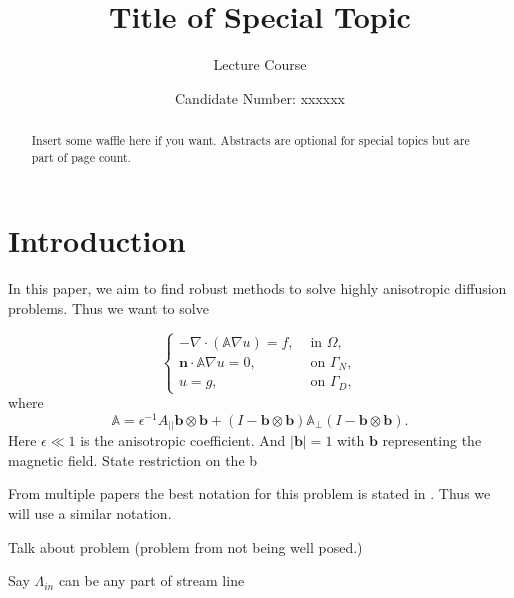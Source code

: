 \documentclass[12pt,a4paper]{article}
\title{Title of Special Topic}
\author{Lecture Course}
\date{Candidate Number: xxxxxx}
\begin{document}
\maketitle

\thispagestyle{empty}

\newpage
\setcounter{page}{1}



\begin{abstract}
  Insert some waffle here if you want. Abstracts are optional for
  special topics but are part of page count.
\end{abstract}

\section{Introduction}
In this paper, we aim to find robust methods to solve highly anisotropic diffusion problems. Thus we want to solve

\begin{equation}
\begin{cases}
-\nabla \cdot (\mathbb{A}\nabla u) = f, & \text{ in }\Omega,\\
\mathbf{n}\cdot \mathbb{A}\nabla u = 0, & \text{ on }\Gamma_N, \\
u = g, & \text{  on }\Gamma_D,
\end{cases}
\end{equation}
where
\begin{equation}
\mathbb{A} = \epsilon^{-1} A_{||}\mathbf{b}\otimes \mathbf{b}
+(I - \mathbf{b}\otimes \mathbf{b})\mathbb{A}_{\perp}
(I - \mathbf{b}\otimes \mathbf{b}).
\end{equation}
    Here $\epsilon \ll 1$ is the anisotropic coefficient. And $|\mathbf{b}|=1$ with $\mathbf{b}$ representing the magnetic field.
State restriction on the b

From multiple papers the best notation for this problem is stated in \cite{} \cite{}. Thus we will use a similar notation. 

Talk about problem (problem from not being well posed.)

Say $\Lambda_{in}$ can be any part of stream line
\end{document}
